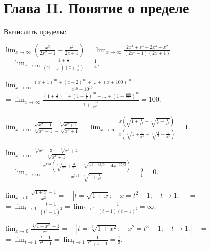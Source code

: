 \documentclass[a5paper,10pt]{article}
\begin{document}

\bigskip
\section* {Глава II. Понятие о пределе}

\medskip
\noindent Вычислить пределы:

\medskip
{} $\displaystyle \lim_{x\to\infty}
\left(\frac{x^3}{2x^2-1}-\frac{x^2}{2x+1}\right)=
\lim_{x\to\infty}\frac{2x^4+x^3-2x^4+x^2}{(2x^2-1)(2x+1)}=$\\
$\displaystyle =\lim_{x\to\infty}\frac{1+\frac{1}{x}}
{\left(2-\frac{1}{x^2}\right)\left(2+\frac{1}{x}\right)}=\frac14$.

\medskip
{} $\displaystyle\lim_{x\to\infty}
\frac{(x+1)^{10}+(x+2)^{10}+\ldots+(x+100)^{10}}{x^{10}+10^{10}}=$\\
$\displaystyle =\lim_{x\to\infty}
\frac{\left(1+\frac1x\right)^{10}+\left(1+\frac2x\right)^{10}+
\ldots+\left(1+\frac{100}{x}\right)^{10}}{1+\frac{10^{10}}{x^{10}}}=100$.

\medskip
{} $\displaystyle\lim_{x\to\infty}
\frac{\sqrt{x^2+1}-\sqrt[3]{x^2+1}}{\sqrt[4]{x^4+1}-\sqrt[5]{x^4+1}}=
\lim_{x\to\infty}\frac{x\left(\sqrt{1+\frac{1}{x^2}}-
\sqrt[3]{\frac{1}{x}+\frac{1}{x^3}}\right)}
{x\left(\sqrt[4]{1+\frac{1}{x^4}}-\sqrt[5]{\frac{1}{x}+\frac{1}{x^5}}\right)}=1$.

\medskip
{} $\displaystyle\lim_{x\to\infty}
\frac{\sqrt[3]{x^4+3}-\sqrt[5]{x^3+4}}{\sqrt[3]{x^7+1}}=$\\
$\displaystyle =\lim_{x\to\infty}\frac{x^{7/3}
\left(\sqrt[3]{\frac{1}{x^3}+\frac{3}{x^7}}-
\sqrt[5]{x^{3-35/3}+4x^{-35/3}}\right)}
{x^{7/3}\cdot\sqrt[3]{1+\frac{1}{x^7}}}=\frac01=0$.

\medskip
{} $\displaystyle\lim_{x\to 0}
\frac{\sqrt{1+x}-1}{x^2}=\quad|t=\sqrt{1+x};\quad x=t^2-1;\quad t\to 1.|\quad=$\\
$\displaystyle =\lim_{t\to 1}\frac{t-1}{(t^2-1)^2}=
\lim_{t\to 1}\frac{1}{(t-1)(t+1)^2}=\infty$.

\medskip
{} $\displaystyle\lim_{x\to 0}
\frac{\sqrt[3]{1+x^2}-1}{x^2}=\quad|t=
\sqrt[3]{1+x^2};\quad x^2=t^3-1;\quad t\to 1.|\quad=$\\
$\displaystyle =\lim_{t\to 1}\frac{t-1}{t^3-1}=
\lim_{t\to 1}\frac{1}{t^2+t+1}=\frac13$.
\end{document}
